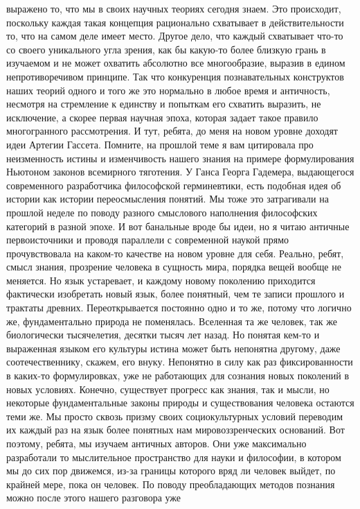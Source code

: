 выражено то, что мы в своих научных теориях сегодня знаем. Это происходит,
поскольку каждая такая концепция рационально схватывает в действительности то,
что на самом деле имеет место. Другое дело, что каждый схватывает что-то со
своего уникального угла зрения, как бы какую-то более близкую грань в изучаемом
и не может охватить абсолютно все многообразие, выразив в едином
непротиворечивом принципе. Так что конкуренция познавательных конструктов наших
теорий одного и того же это нормально в любое время и античность, несмотря на
стремление к единству и попыткам его схватить выразить, не исключение, а скорее
первая научная эпоха, которая задает такое правило многогранного рассмотрения. И
тут, ребята, до меня на новом уровне доходят идеи Артегии Гассета. Помните, на
прошлой теме я вам цитировала про неизменность истины и изменчивость нашего
знания на примере формулирования Ньютоном законов всемирного тяготения. У Ганса
Георга Гадемера, выдающегося современного разработчика философской герминевтики,
есть подобная идея об истории как истории переосмысления понятий. Мы тоже это
затрагивали на прошлой неделе по поводу разного смыслового наполнения
философских категорий в разной эпохе. И вот банальные вроде бы идеи, но я читаю
античные первоисточники и проводя параллели с современной наукой прямо
прочувствовала на каком-то качестве на новом уровне для себя. Реально, ребят,
смысл знания, прозрение человека в сущность мира, порядка вещей вообще не
меняется. Но язык устаревает, и каждому новому поколению приходится фактически
изобретать новый язык, более понятный, чем те записи прошлого и трактаты
древних. Переоткрывается постоянно одно и то же, потому что логично же,
фундаментально природа не поменялась. Вселенная та же человек, так же
биологически тысячелетия, десятки тысяч лет назад. Но понятая кем-то и
выраженная языком его культуры истина может быть непонятна другому, даже
соотечественнику, скажем, его внуку. Непонятно в силу как раз фиксированности в
каких-то формулировках, уже не работающих для сознания новых поколений в новых
условиях. Конечно, существует прогресс как знания, так и мысли, но некоторые
фундаментальные законы природы и существования человека остаются теми же. Мы
просто сквозь призму своих социокультурных условий переводим их каждый раз на
язык более понятных нам мировоззренческих оснований. Вот поэтому, ребята, мы
изучаем античных авторов. Они уже максимально разработали то мыслительное
пространство для науки и философии, в котором мы до сих пор движемся, из-за
границы которого вряд ли человек выйдет, по крайней мере, пока он человек. По
поводу преобладающих методов познания можно после этого нашего разговора уже
